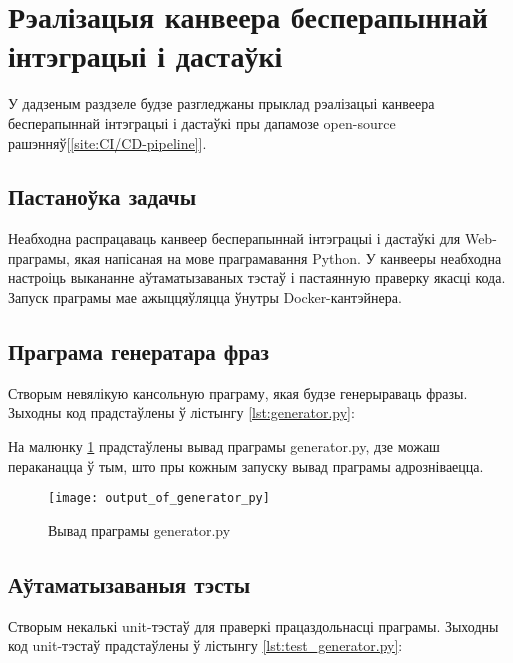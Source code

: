 \section{Рэалізацыя канвеера бесперапыннай інтэграцыі і дастаўкі}

У дадзеным раздзеле будзе разгледжаны прыклад рэалізацыі
канвеера бесперапыннай інтэграцыі і дастаўкі пры дапамозе
open-source рашэнняў[\ref{site:CI/CD-pipeline}].

\subsection{Пастаноўка задачы}

Неабходна распрацаваць канвеер бесперапыннай інтэграцыі і дастаўкі
для Web-праграмы, якая напісаная на мове праграмавання Python.
У канвееры неабходна настроіць выкананне аўтаматызаваных тэстаў і
пастаянную праверку якасці кода.
Запуск праграмы мае ажыццяўляцца ўнутры Docker-кантэйнера.

\subsection{Праграма генератара фраз}

Створым невялікую кансольную праграму, якая будзе генерыраваць
фразы. Зыходны код прадстаўлены ў лістынгу \ref{lst:generator.py}:


На малюнку \ref{figure:output of generator.py} прадстаўлены вывад
праграмы generator.py, дзе можаш пераканацца ў тым, што пры кожным
запуску вывад праграмы адрозніваецца.

\clearpage

\begin{figure}[h!]
    \centering
    \texttt{[image: output\_of\_generator\_py]}
    \caption{Вывад праграмы generator.py}
    \label{figure:output of generator.py} 
\end{figure}

\vspace{-\baselineskip}
\subsection{Аўтаматызаваныя тэсты}

Створым некалькі unit-тэстаў для праверкі працаздольнасці праграмы.
Зыходны код unit-тэстаў прадстаўлены ў лістынгу
\ref{lst:test_generator.py}:

